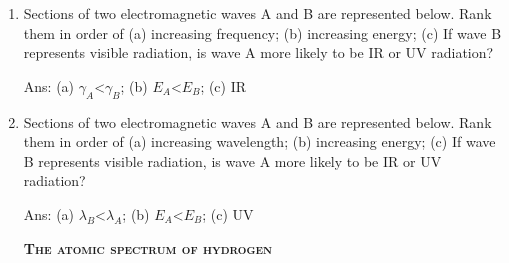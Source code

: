 \documentclass[main.tex]{subfiles}
\begin{document}
\begin{multicols*}{2}
\begin{enumerate}
\item Sections of two electromagnetic waves A and B  are represented below. Rank them in order of (a) increasing frequency; (b) increasing energy;  (c) If wave B represents visible radiation, is wave A more likely to be IR or UV radiation?  
     \begin{centering}
     \end{centering}
  \begin{flushright}\small Ans: (a) $\gamma_A$<$\gamma_B$; (b) $E_A$<$E_B$; (c) IR \end{flushright}

\item Sections of two electromagnetic waves A and B  are represented below. Rank them in order of (a) increasing wavelength; (b) increasing energy;  (c) If wave B represents visible radiation, is wave A more likely to be IR or UV radiation?  
     \begin{centering}
     \end{centering}
  \begin{flushright}\small Ans: (a) $\lambda_B$<$\lambda_A$; (b) $E_A$<$E_B$; (c) UV \end{flushright}
    
     
{\raggedright\textsc{\textbf{The atomic spectrum of hydrogen }}\par}


\end{enumerate}
\end{multicols*}
\end{document}
